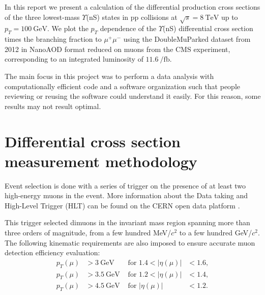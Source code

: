 \documentclass[a4paper,11pt]{article}
\begin{document}
In this report we present a calculation of the differential production cross sections of the three lowest-mass $\Upsilon$(nS) states in pp collisions at $\sqrt{s}=\SI{8}{\tera\eV}$ up to $p_T = \SI{100}{\giga\eV}$. 
We plot the $p_T$ dependence of the $\Upsilon$(nS) differential cross section times the branching fraction to $\mu^+\mu^-$ using the DoubleMuParked dataset from 2012 in NanoAOD format reduced on muons\cite{dataA} from the CMS experiment, corresponding to an integrated luminosity of $\SI{11.6}{\per\femto\barn}$. 

The main focus in this project was to perform a data analysis with computationally efficient code and a software organization such that people reviewing or reusing the software could understand it easily. For this reason, some results may not result optimal.

\section{Differential cross section measurement methodology}
Event selection is done with a series of trigger on the presence of at least two high-energy muons in the event. More information about the Data taking and High-Level Trigger (HLT) can be found on the CERN open data platform \cite{dataB}\cite{dataC}.

This trigger selected dimuons in the invariant mass region spanning more than three orders of magnitude, from a few hundred MeV/$c^2$ to a few hundred GeV/$c^2$.
The following kinematic requirements are also imposed to ensure accurate muon detection efficiency evaluation:
\begin{align}
p_T(\mu) &> \SI{3}{\giga\eV} &   \text{ for } 1.4 < |\eta(\mu)|&< 1.6,\\\nonumber
p_T(\mu) &> \SI{3.5}{\giga\eV} &  \text{ for } 1.2< |\eta(\mu)|&<1.4,\\\nonumber
p_T(\mu) &> \SI{4.5}{\giga\eV} & \text{ for } |\eta(\mu)|&< 1.2.
\end{align}
\end{document}
